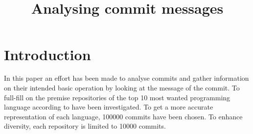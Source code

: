 \documentclass{article}
\title{Analysing commit messages}
\begin{document}
  \maketitle

  \section{Introduction}
  In this paper an effort has been made to analyse commits and gather
  information on their intended basic operation by looking at the message of
  the commit. To full-fill on the premise repositories of the top 10 most wanted
  programming language according to \cite{so-survey} have been investigated. To
  get a more accurate representation of each language, 100000 commits have been
  chosen. To enhance diversity, each repository is limited to 10000 commits.
\end{document}
